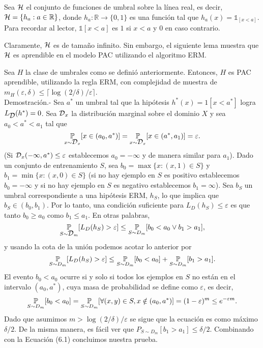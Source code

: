 \begin{ejem}
    Sea $\H$ el conjunto de funciones de umbral sobre la línea real, es decir, $\H = \{h_a : a \in \mathbb{R}\}$, donde $h_a : \mathbb{R} \rightarrow \{0, 1\}$ es una función tal que $h_a(x) = \mathbb{1}_{[x<a]}$. Para recordar al lector, $\mathbb{1}[x<a]$ es $1$ si $x < a$ y $0$ en caso contrario. 
\end{ejem}
    Claramente, $\H$ es de tamaño infinito. Sin embargo, el siguiente lema muestra que $\H$ es aprendible en el modelo PAC utilizando el algoritmo ERM.

\begin{lema}
    Sea $H$ la clase de umbrales como se definió anteriormente. Entonces, $H$ es PAC aprendible, utilizando la regla ERM, con complejidad de muestra de $m_H(\varepsilon, \delta) \leq \lceil \log(2/\delta)/\varepsilon \rceil$.\\

    Demostración.-\; Sea $a^*$ un umbral tal que la hipótesis $h^*(x) = 1[x<a^*]$ logra $L_{\D}(h^*) = 0$. Sea $\D_x$ la distribución marginal sobre el dominio $X$ y sea $a_0 < a^* < a_1$ tal que 
    $$\underset{{x \sim \D_x}}{\mathbb{P}}[x \in (a_0, a^*)] = \underset{{x \sim \D_x}}{\mathbb{P}}[x \in (a^*, a_1)] = \varepsilon.$$ 
    (Si $\D_x(-\infty, a^*) \leq \varepsilon$ establecemos $a_0 = -\infty$ y de manera similar para $a_1$). Dado un conjunto de entrenamiento $S$, sea $b_0 = \max\{x : (x, 1) \in S\}$ y $b_1 = \min\{x : (x, 0) \in S\}$ (si no hay ejemplo en $S$ es positivo establecemos $b_0 = -\infty$ y si no hay ejemplo en $S$ es negativo establecemos $b_1 = \infty$). Sea $b_S$ un umbral correspondiente a una hipótesis ERM, $h_S$, lo que implica que $b_S \in (b_0, b_1)$. Por lo tanto, una condición suficiente para $L_D(h_S) \leq \varepsilon$ es que tanto $b_0 \geq a_0$ como $b_1 \leq a_1$. En otras palabras, 
    $$\underset{S \sim \D_m}{\P}[L_D(h_S) > \varepsilon] \leq \underset{S \sim D_m}{\P}[b_0 < a_0 \lor b_1 > a_1],$$ 
    y usando la cota de la unión podemos acotar lo anterior por 
    \begin{equation}
	\underset{S \sim D_m}{\P}[L_D(h_S) > \varepsilon] \leq \underset{S \sim D_m}{\P}[b_0 < a_0] + \underset{S \sim D_m}{\P}[b_1 > a_1]. 
    \end{equation}
    El evento $b_0 < a_0$ ocurre si y solo si todos los ejemplos en $S$ no están en el intervalo $(a_0, a^*)$, cuya masa de probabilidad se define como $\varepsilon$, es decir, 
    $$\underset{S \sim D_m}{\P}[b_0 < a_0] = \underset{S \sim D_m}{\P}[\forall (x, y) \in S, x \notin (a_0, a^*)] = (1 - \varepsilon)^m \leq e^{-\varepsilon m}.$$ 
    Dado que asumimos $m > \log(2/\delta)/\varepsilon$ se sigue que la ecuación es como máximo $\delta/2$. De la misma manera, es fácil ver que $P_{S \sim D_m}[b_1 > a_1] \leq \delta/2$. Combinando con la Ecuación (6.1) concluimos nuestra prueba.
\end{lema}

